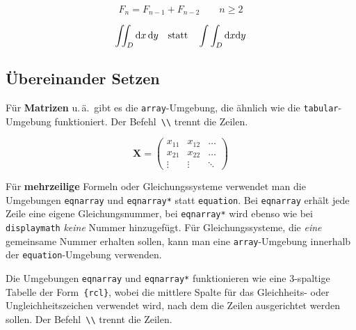 \begin{LTXexample}
\begin{displaymath}
F_{n} = F_{n-1} + F_{n-2}
 \qquad n \ge 2
\end{displaymath}
\end{LTXexample}


\begin{LTXexample}
\begin{displaymath}
\int\!\!\!\int_{D} 
\mathrm{d}x\,\mathrm{d}y
\quad \textnormal{statt} \quad
\int\int_{D} 
\mathrm{d}x \mathrm{d}y
\end{displaymath}
\end{LTXexample}



\subsection{Übereinander Setzen}

Für \textbf{Matrizen} u.\,ä.\ gibt es die
\texttt{array}-Umgebung, die ähnlich wie die
\texttt{tabular}-Umgebung funktioniert.
Der Befehl~\lstinline|\\| trennt die Zeilen.

\begin{LTXexample}
\begin{displaymath}
\mathbf{X} =
\left( \begin{array}{ccc}
x_{11} & x_{12} & \ldots \\
x_{21} & x_{22} & \ldots \\
\vdots & \vdots & \ddots
\end{array} \right)
\end{displaymath}
\end{LTXexample}


Für \textbf{mehrzeilige} Formeln oder Gleichungssysteme
verwendet man die Umgebungen \texttt{eqnarray} und
\texttt{eqnarray*} statt \texttt{equation}. 
Bei \texttt{eqnarray} erhält jede Zeile eine eigene
Gleichungsnummer, bei \texttt{eqnarray*} wird ebenso wie bei
\texttt{displaymath} \emph{keine} Nummer hinzugefügt.
Für Gleichungssysteme, die \emph{eine} gemeinsame Nummer
erhalten sollen, kann man eine \texttt{array}-Umgebung innerhalb
der \texttt{equation}-Umgebung verwenden.

Die Umgebungen \texttt{eqnarray} und \texttt{eqnarray*}
funktionieren wie eine 3-spaltige Tabelle der Form~\lstinline|{rcl}|,
wobei die mittlere Spalte für das Gleichheits- oder
Ungleichheitszeichen verwendet wird, nach dem die Zeilen
ausgerichtet werden sollen.
Der Befehl~\lstinline|\\| trennt die Zeilen.

